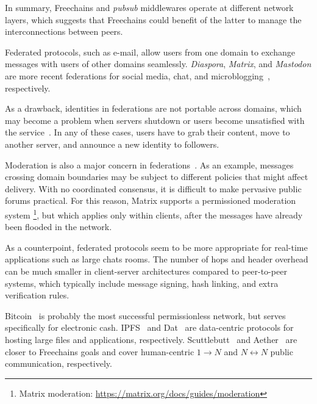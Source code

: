 \documentclass[12pt]{article}
\newcommand{\FC}       {Freechains\xspace}
\newcommand{\Xon} {$1{\rightarrow}N$\xspace}
\newcommand{\Xnn} {$N{\leftrightarrow}N$\xspace}
\begin{document}
In summary, \FC and \emph{pubsub} middlewares operate at different network
layers, which suggests that \FC could benefit of the latter to manage the
interconnections between peers.


Federated protocols, such as e-mail, allow users from one domain to exchange
messages with users of other domains seamlessly.
\emph{Diaspora}, \emph{Matrix}, and \emph{Mastodon} are more recent
federations for social media, chat, and microblogging~\cite{p2p.ecosystem},
respectively.

As a drawback, identities in federations are not portable across domains, which
may become a problem when servers shutdown or users become unsatisfied with the
service~\cite{fed.distributed}.
In any of these cases, users have to grab their content, move to another
server, and announce a new identity to followers.

Moderation is also a major concern in federations~\cite{p2p.ecosystem}.
As an example, messages crossing domain boundaries may be subject to different
policies that might affect delivery.
With no coordinated consensus, it is difficult to make pervasive public forums
practical.
%
For this reason, Matrix supports a permissioned moderation system%
\footnote{Matrix moderation: \url{https://matrix.org/docs/guides/moderation}},
but which applies only within clients, after the messages have already been
flooded in the network.

As a counterpoint, federated protocols seem to be more appropriate for
real-time applications such as large chats rooms.
The number of hops and header overhead can be much smaller in client-server
architectures compared to peer-to-peer systems, which typically include message
signing, hash linking, and extra verification rules.


Bitcoin~\cite{p2p.bitcoin} is probably the most successful permissionless
network, but serves specifically for electronic cash.
IPFS~\cite{p2p.ipfs} and Dat~\cite{p2p.dat} are data-centric protocols for
hosting large files and applications, respectively.
Scuttlebutt~\cite{p2p.scuttlebutt} and Aether~\cite{p2p.ecosystem} are closer
to \FC goals and cover human-centric \Xon and \Xnn public communication,
respectively.
\end{document}

